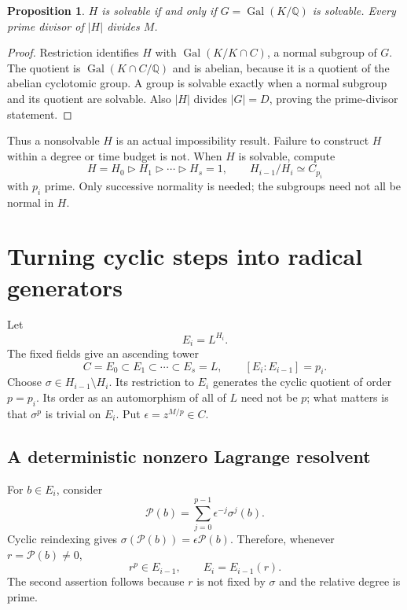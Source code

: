 \documentclass[11pt,a4paper]{article}
\newtheorem{proposition}[theorem]{Proposition}
\theoremstyle{definition}
\theoremstyle{remark}
\newcommand{\Q}{\mathbb Q}
\newcommand{\Gal}{\operatorname{Gal}}
\begin{document}
\begin{proposition}\label{prop:base-solvable}
$H$ is solvable if and only if $G=\Gal(K/\Q)$ is solvable. Every prime divisor of
$|H|$ divides $M$.
\end{proposition}
\begin{proof}
Restriction identifies $H$ with $\Gal(K/K\cap C)$, a normal subgroup of $G$.
The quotient is $\Gal(K\cap C/\Q)$ and is abelian, because it is a quotient of
the abelian cyclotomic group. A group is solvable exactly when a normal
subgroup and its quotient are solvable. Also $|H|$ divides $|G|=D$, proving the
prime-divisor statement.
\end{proof}

Thus a nonsolvable $H$ is an actual impossibility result. Failure to construct
$H$ within a degree or time budget is not. When $H$ is solvable, compute
\begin{equation}\label{eq:series}
 H=H_0\triangleright H_1\triangleright\cdots\triangleright H_s=1,
 \qquad H_{i-1}/H_i\simeq C_{p_i}
\end{equation}
with $p_i$ prime. Only successive normality is needed; the subgroups need not
all be normal in $H$.

\section{Turning cyclic steps into radical generators}
\label{sec:resolvents}
Let
\[
 E_i=L^{H_i}.
\]
The fixed fields give an ascending tower
\[
 C=E_0\subset E_1\subset\cdots\subset E_s=L,
 \qquad [E_i:E_{i-1}]=p_i.
\]
Choose $\sigma\in H_{i-1}\setminus H_i$. Its restriction to $E_i$ generates the
cyclic quotient of order $p=p_i$. Its order as an automorphism of all of $L$
need not be $p$; what matters is that $\sigma^p$ is trivial on $E_i$. Put
$\epsilon=z^{M/p}\in C$.

\subsection{A deterministic nonzero Lagrange resolvent}
For $b\in E_i$, consider
\begin{equation}\label{eq:projector}
 \mathcal P(b)=\sum_{j=0}^{p-1}\epsilon^{-j}\sigma^j(b).
\end{equation}
Cyclic reindexing gives $\sigma(\mathcal P(b))=\epsilon\mathcal P(b)$.
Therefore, whenever $r=\mathcal P(b)\ne0$,
\begin{equation}\label{eq:kummer}
 r^p\in E_{i-1},\qquad E_i=E_{i-1}(r).
\end{equation}
The second assertion follows because $r$ is not fixed by $\sigma$ and the
relative degree is prime.
\end{document}
